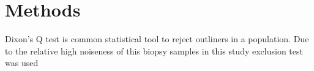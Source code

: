 \chapter{Methods}

Dixon's Q test is common statistical tool to reject outliners in a population. Due to the relative high noiseness of this biopsy samples in this study  exclusion test was used 